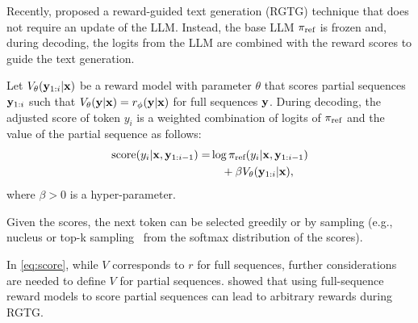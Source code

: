 Recently, \citet{khanov2023alignment} proposed a reward-guided text generation (RGTG) technique that does not require an update of the LLM. 
Instead, the base LLM \(\pi_\text{ref}\) is frozen and, during decoding, the logits from the LLM are combined with the reward scores to guide the text generation.  

Let $V_\theta({\mathbf{y}}_{1:i}|{\mathbf{x}})$ be a reward model with parameter \(\theta\) that scores partial sequences ${\mathbf{y}}_{1:i}$ such that $V_\theta({\mathbf{y}}|{\mathbf{x}})=r_\phi({\mathbf{y}}|{\mathbf{x}})$ for full sequences ${\mathbf{y}}$.  
During decoding, the adjusted score of token \(y_{i}\) is a weighted combination of logits of \(\pi_\text{ref}\) and the value of the partial sequence as follows:
%
\begin{equation}
  \label{eq:score}
  \begin{aligned}
      \textstyle
      \mathrm{score}(y_{i} | {\mathbf{x}}, {\mathbf{y}}_{1:i-1}) = &\log \pi_\text{ref}(y_{i} \vert {\mathbf{x}}, {\mathbf{y}}_{1:i-1}) \\
        &\quad + \beta V_\theta({\mathbf{y}}_{1:i} | {\mathbf{x}}) ,
  \end{aligned}
\end{equation}
%
where $\beta > 0$ is a hyper-parameter. 

Given the scores, the next token can be selected greedily or by sampling (e.g., nucleus or top-k sampling~\cite{fan2018hierarchical, holtzmancurious} from the softmax distribution of the scores). 


In \eqref{eq:score}, while $V$ corresponds to $r$ for full sequences, further considerations are needed to define $V$ for partial sequences. \citet{rashid2024critical} showed that using full-sequence reward models to score partial sequences can lead to arbitrary rewards during RGTG.
